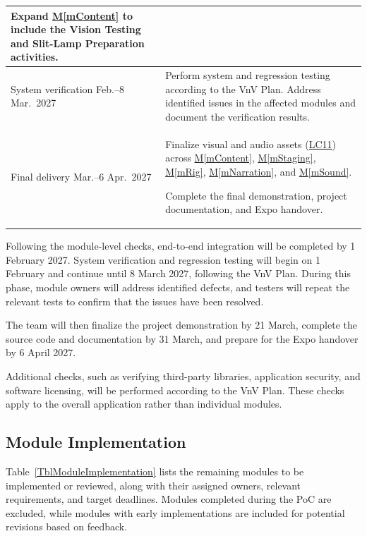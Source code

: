 \documentclass[10pt, titlepage]{article}
\newcommand{\srsurl}{https://team-hindsight.github.io/ophthamology-game/SRS/SRS.pdf}
\newcommand{\srsitemref}[2]{\href{\srsurl\#nameddest=#1}{#2}}
\newcommand{\mref}[1]{\texorpdfstring{\hyperref[md:#1]{M\ref*{#1}}}{M\ref*{#1}}}
\begin{document}
\begin{table}[H]
\begin{tabularx}{\textwidth}{@{}
    >{\raggedright\arraybackslash}p{3.6cm}
    >{\raggedright\arraybackslash}X@{}}
Expand \mref{mContent} to include the Vision Testing
and Slit-Lamp Preparation activities.\\

\midrule

System verification\newline
1 Feb.--8 Mar.\ 2027 &
Perform system and regression testing according to the
VnV Plan. Address identified issues in the affected
modules and document the verification results.\\

\midrule

Final delivery\newline
9 Mar.--6 Apr.\ 2027 &
Finalize visual and audio assets
(\srsitemref{LC_Assets}{LC11}) across
\mref{mContent}, \mref{mStaging}, \mref{mRig},
\mref{mNarration}, and \mref{mSound}.

Complete the final demonstration, project documentation,
and Expo handover.\\

\bottomrule
\end{tabularx}
\end{table}


Following the module-level checks, end-to-end integration will be completed
by 1 February 2027. System verification and regression testing will begin
on 1 February and continue until 8 March 2027, following the VnV Plan. During this phase,
module owners will address identified defects, and testers will repeat
the relevant tests to confirm that the issues have been resolved.

The team will then finalize the project demonstration by 21 March,
complete the source code and documentation by 31 March, and prepare
for the Expo handover by 6 April 2027.

Additional checks, such as verifying third-party libraries,
application security, and software licensing, will be
performed according to the VnV Plan. These checks apply
to the overall application rather than individual modules.

\newpage
\subsection*{Module Implementation}

Table~\ref{TblModuleImplementation} lists the remaining modules
to be implemented or reviewed, along with their assigned owners,
relevant requirements, and target deadlines. Modules completed
during the PoC are excluded, while modules with early
implementations are included for potential revisions based on
feedback.
\end{document}
